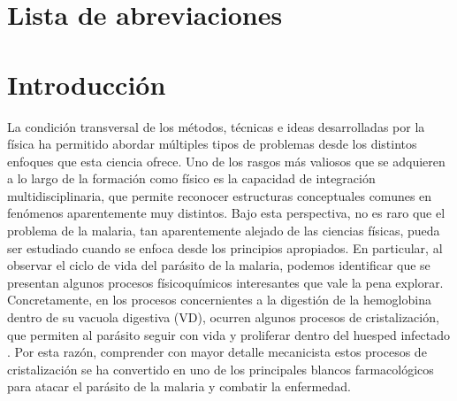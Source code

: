 \documentclass[12pt,letterpaper,oneside]{report}
\begin{document}
\newpage
\tableofcontents %

\newpage
\listoffigures %

\newpage
\chapter*{Lista de abreviaciones}
\begin{acronym}[MTD] %
\end{acronym}

\newpage

\chapter{Introducción}



La condición transversal de los métodos, técnicas e ideas desarrolladas por la física ha permitido abordar múltiples tipos de problemas desde los distintos enfoques que esta ciencia ofrece. Uno de los rasgos más valiosos que se adquieren a lo largo de la formación como físico es la capacidad de integración multidisciplinaria, que permite reconocer estructuras conceptuales comunes en fenómenos aparentemente muy distintos. Bajo esta perspectiva, no es raro que el problema de la malaria, tan aparentemente alejado de las ciencias físicas, pueda ser estudiado cuando se enfoca desde los principios apropiados. En particular, al observar el ciclo de vida del parásito de la malaria, podemos identificar que se presentan algunos procesos físicoquímicos interesantes que vale la pena explorar. Concretamente, en los procesos concernientes a la digestión de la hemoglobina dentro de su vacuola digestiva (VD), ocurren algunos procesos de cristalización, que permiten al parásito seguir con vida y proliferar dentro del huesped infectado \cite{Kapishnikov2011}. Por esta razón, comprender con mayor detalle mecanicista estos procesos de cristalización se ha convertido en uno de los principales blancos farmacológicos para atacar el parásito de la malaria y combatir la enfermedad.\\
\end{document}
